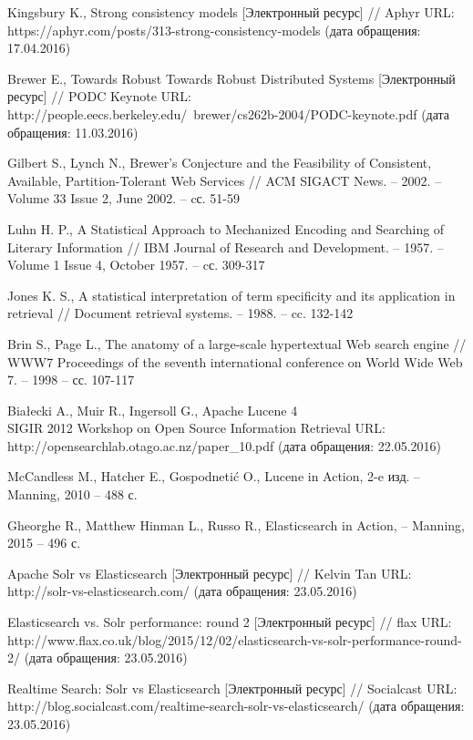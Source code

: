 \begingroup 
{}
\begin{thebibliography}{00}

	Kingsbury K., Strong consistency models
	[Электронный ресурс] //
	Aphyr
	URL: https://aphyr.com/posts/313-strong-consistency-models
	(дата обращения: 17.04.2016)
	
	Brewer E., Towards Robust Towards Robust Distributed Systems
	[Электронный ресурс] //
	PODC Keynote
	URL: http://people.eecs.berkeley.edu/~brewer/cs262b-2004/PODC-keynote.pdf
	(дата обращения: 11.03.2016)
	
	Gilbert S., Lynch N., Brewer’s Conjecture and the Feasibility of Consistent, Available, Partition-Tolerant Web Services //
	ACM SIGACT News. -- 2002. -- Volume 33 Issue 2, June 2002. -- cс. 51-59
	
	Luhn H. P., A Statistical Approach to Mechanized Encoding and Searching of Literary Information //
	IBM Journal of Research and Development. -- 1957. -- Volume 1 Issue 4, October 1957. -- cс. 309-317
	
	Jones K. S., A statistical interpretation of term specificity and its application in retrieval //
	Document retrieval systems. -- 1988. -- cc. 132-142
	
	Brin S., Page L., The anatomy of a large-scale hypertextual Web search engine //
	WWW7 Proceedings of the seventh international conference on World Wide Web 7. -- 1998 -- сс. 107-117

	Białecki A., Muir R., Ingersoll G., Apache Lucene 4 \\
	SIGIR 2012 Workshop on Open Source Information Retrieval
	URL: http://opensearchlab.otago.ac.nz/paper\_10.pdf
	(дата обращения: 22.05.2016)
	
	McCandless M., Hatcher E., Gospodnetić O., Lucene in Action,
	2-e изд. -- Manning, 2010 -- 488 с.
	
	Gheorghe R., Matthew Hinman L., Russo R., Elasticsearch in Action, -- Manning, 2015 -- 496 с.

	Apache Solr vs Elasticsearch
	[Электронный ресурс] //
	Kelvin Tan
	URL: http://solr-vs-elasticsearch.com/
	(дата обращения: 23.05.2016)
	
	Elasticsearch vs. Solr performance: round 2
	[Электронный ресурс] //
	flax
	URL: http://www.flax.co.uk/blog/2015/12/02/elasticsearch-vs-solr-performance-round-2/
	(дата обращения: 23.05.2016)
	
	Realtime Search: Solr vs Elasticsearch
	[Электронный ресурс] //
	Socialcast
	URL: http://blog.socialcast.com/realtime-search-solr-vs-elasticsearch/
	(дата обращения: 23.05.2016)

\end{thebibliography}
\endgroup

\clearpage
